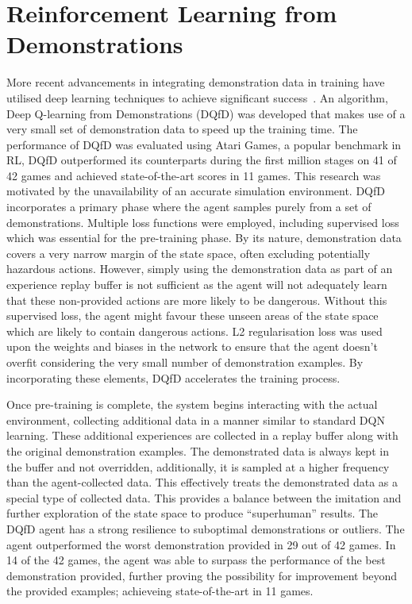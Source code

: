 \section{Reinforcement Learning from Demonstrations}


More recent advancements in integrating demonstration data in training have utilised deep learning techniques to achieve significant success~\cite{deepQLearningFromDemo}.
An algorithm, Deep Q-learning from Demonstrations (DQfD) was developed that makes use of a very small set of demonstration data to speed up the training time.
The performance of DQfD was evaluated using Atari Games, a popular benchmark in RL, DQfD outperformed its counterparts during the first million stages on 41 of 42 games and achieved state-of-the-art scores in 11 games.
This research was motivated by the unavailability of an accurate simulation environment.
DQfD incorporates a primary phase where the agent samples purely from a set of demonstrations.
Multiple loss functions were employed, including supervised loss which was essential for the pre-training phase.
By its nature, demonstration data covers a very narrow margin of the state space, often excluding potentially hazardous actions.
However, simply using the demonstration data as part of an experience replay buffer is not sufficient as the agent will not adequately learn that these non-provided actions are more likely to be dangerous.
Without this supervised loss, the agent might favour these unseen areas of the state space which are likely to contain dangerous actions.
L2 regularisation loss was used upon the weights and biases in the network to ensure that the agent doesn't overfit considering the very small number of demonstration examples.
By incorporating these elements, DQfD accelerates the training process.

Once pre-training is complete, the system begins interacting with the actual environment, collecting additional data in a manner similar to standard DQN learning.
These additional experiences are collected in a replay buffer along with the original demonstration examples.
The demonstrated data is always kept in the buffer and not overridden, additionally, it is sampled at a higher frequency than the agent-collected data.
This effectively treats the demonstrated data as a special type of collected data.
This provides a balance between the imitation and further exploration of the state space to produce ``superhuman'' results.
The DQfD agent has a strong resilience to suboptimal demonstrations or outliers.
The agent outperformed the worst demonstration provided in 29 out of 42 games.
In 14 of the 42 games, the agent was able to surpass the performance of the best demonstration provided, further proving the possibility for improvement beyond the provided examples; achieveing state-of-the-art in 11 games.

